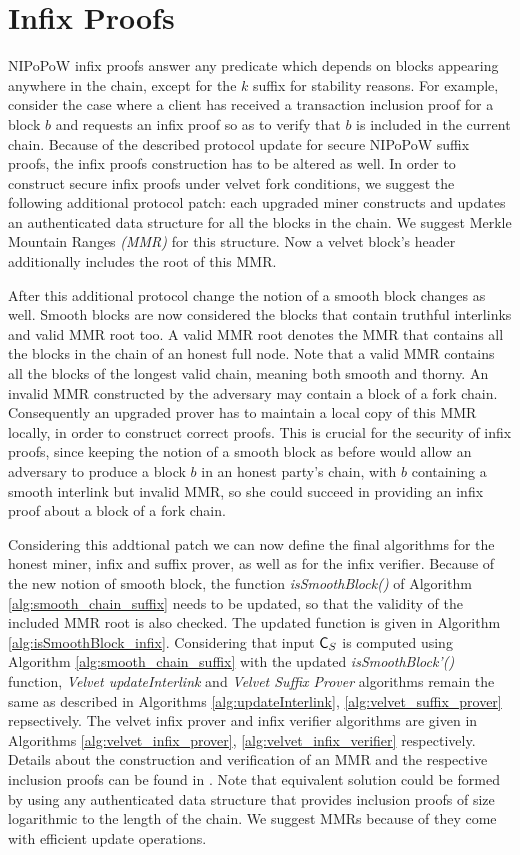 \section{Infix Proofs}\label{sec:infix}
NIPoPoW infix proofs answer any predicate which depends on blocks appearing anywhere in the chain, except for the $k$ suffix for stability reasons. For example, consider the case where a client has received a transaction inclusion proof for a block $b$ and requests an infix proof so as to verify that $b$ is included in the current chain.
Because of the described protocol update for secure NIPoPoW suffix proofs, the infix proofs construction has to be altered as well. In order to construct secure infix proofs under velvet fork conditions, we suggest the following additional protocol patch: each upgraded miner constructs and updates an authenticated data structure for all the blocks in the chain. We suggest Merkle Mountain Ranges \emph{(MMR)} for this structure. Now a velvet block's header additionally includes the root of this MMR.

After this additional protocol change the notion of a smooth block changes as well. Smooth blocks are now considered the blocks that contain truthful interlinks and valid MMR root too. A valid MMR root denotes the MMR that contains all the blocks in the chain of an honest full node. Note that a valid MMR contains all the blocks of the longest valid chain, meaning both smooth and thorny. An invalid MMR constructed by the adversary may contain a block of a fork chain. Consequently an upgraded prover has to maintain a local copy of this MMR locally, in order to construct correct proofs. This is crucial for the security of infix proofs, since keeping the notion of a smooth block as before would allow an adversary to produce a block $b$ in an honest party's chain, with $b$ containing a smooth interlink but invalid MMR, so she could succeed in providing an infix proof about a block of a fork chain.

Considering this addtional patch we can now define the final algorithms for the honest miner, infix and suffix prover, as well as for the infix verifier. Because of the new notion of smooth block, the function \textit{isSmoothBlock()} of Algorithm \ref{alg:smooth_chain_suffix} needs to be updated, so that the validity of the included MMR root is also checked. The updated function is given in Algorithm \ref{alg:isSmoothBlock_infix}. Considering that input $\mathsf{C}_S$ is computed using Algorithm \ref{alg:smooth_chain_suffix} with the updated \textit{isSmoothBlock'()} function, \emph{Velvet updateInterlink} and \emph{Velvet Suffix Prover} algorithms remain the same as described in Algorithms \ref{alg:updateInterlink}, \ref{alg:velvet_suffix_prover} repsectively. The velvet infix prover and infix verifier algorithms are given in Algorithms \ref{alg:velvet_infix_prover}, \ref{alg:velvet_infix_verifier} respectively. Details about the construction and verification of an MMR and the respective inclusion proofs can be found in \cite{ct}.
Note that equivalent solution could be formed by using any authenticated data structure that provides inclusion proofs of size logarithmic to the length of the chain. We suggest MMRs because of they come with efficient update operations.

